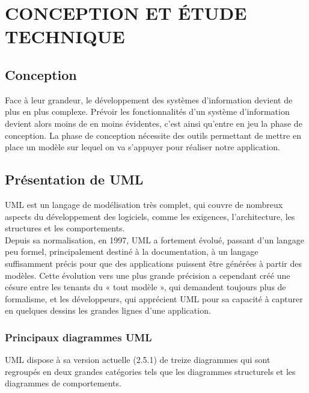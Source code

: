 \chapter{CONCEPTION ET ÉTUDE TECHNIQUE}
	\section{Conception}
	
	Face à leur grandeur, le développement des systèmes d'information devient de plus en plus complexe. Prévoir les fonctionnalités d'un système d'information devient alors moins de en moins évidentes, c'est ainsi qu'entre en jeu la phase de conception. La phase de conception nécessite des outils permettant de mettre en place un modèle sur lequel on va s'appuyer pour réaliser notre application.
	

	\section{Présentation de UML}
			UML est un langage de modélisation très complet, qui couvre de nombreux aspects du développement des logiciels, comme les exigences, l’architecture, les structures et les comportements.\\
			
			Depuis sa normalisation, en 1997, UML a fortement évolué, passant d’un langage peu formel, principalement destiné à la documentation, à un langage suffisamment précis pour que des applications puissent être générées à partir des modèles. Cette évolution	vers une plus grande précision a cependant créé une césure entre les tenants du « tout modèle », qui demandent toujours plus de formalisme, et les développeurs, qui apprécient UML pour sa capacité à capturer en quelques dessins les grandes lignes d’une
			application.
		\subsection{Principaux diagrammes UML}
			UML dispose à sa version actuelle (2.5.1) de treize diagrammes qui sont regroupés en deux grandes catégories tels que les diagrammes structurels et les diagrammes de comportements.
